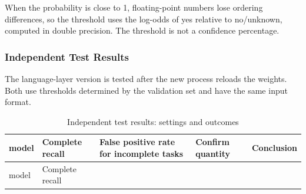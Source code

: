 When the probability is close to 1, floating-point numbers lose ordering differences, so the threshold uses the log-odds of yes relative to no/unknown, computed in double precision. The threshold is not a confidence percentage.

\subsubsection{Independent Test Results}\label{s11-detail-11}

The language-layer version is tested after the new process reloads the weights. Both use thresholds determined by the validation set and have the same input format.

\FloatBarrier\begingroup\small\setlength{\tabcolsep}{2.5pt}
\begin{longtable}[]{@{}
  >{\raggedright\arraybackslash}p{}
  >{\raggedleft\arraybackslash}p{}
  >{\raggedleft\arraybackslash}p{}
  >{\raggedleft\arraybackslash}p{}
  >{\raggedright\arraybackslash}p{}@{}}
\caption{Independent test results: settings and outcomes}\label{tab:s11-5}\tabularnewline
\toprule\noalign{}
\begin{minipage}[b]{\linewidth}\raggedright
model
\end{minipage} & \begin{minipage}[b]{\linewidth}\raggedleft
Complete recall
\end{minipage} & \begin{minipage}[b]{\linewidth}\raggedleft
False positive rate for incomplete tasks
\end{minipage} & \begin{minipage}[b]{\linewidth}\raggedleft
Confirm quantity
\end{minipage} & \begin{minipage}[b]{\linewidth}\raggedright
Conclusion
\end{minipage} \\
\midrule\noalign{}
\endfirsthead
\toprule\noalign{}
\begin{minipage}[b]{\linewidth}\raggedright
model
\end{minipage} & \begin{minipage}[b]{\linewidth}\raggedleft
Complete recall
\end{minipage} & \begin{minipage}[b]{\linewidth}\raggedleft

\end{minipage}
\end{longtable}
